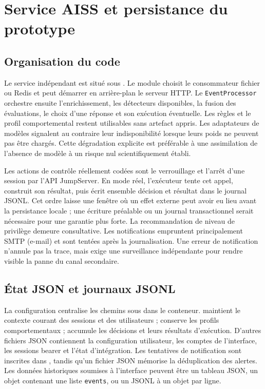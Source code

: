 \documentclass[11pt,a4paper,oneside]{report}
\theoremstyle{definition}
\theoremstyle{plain}
\begin{document}
\section{Service AISS et persistance du prototype}

\subsection{Organisation du code}

Le service indépendant est situé sous . Le
module  choisit le consommateur fichier ou Redis et
peut démarrer en arrière-plan le serveur HTTP. Le
\texttt{EventProcessor} orchestre ensuite l'enrichissement, les détecteurs
disponibles, la fusion des évaluations, le choix d'une réponse et son
exécution éventuelle. Les règles et le profil comportemental restent
utilisables sans artefact appris. Les adaptateurs de modèles signalent au
contraire leur indisponibilité lorsque leurs poids ne peuvent pas être
chargés. Cette dégradation explicite est préférable à une assimilation de
l'absence de modèle à un risque nul scientifiquement établi.

Les actions de contrôle réellement codées sont le verrouillage et l'arrêt
d'une session par l'API JumpServer. En mode réel, l'exécuteur tente cet appel,
construit son résultat, puis écrit ensemble décision et résultat dans le
journal JSONL. Cet ordre laisse une fenêtre où un effet externe peut avoir eu
lieu avant la persistance locale ; une écriture préalable ou un journal
transactionnel serait nécessaire pour une garantie plus forte. La
recommandation de niveau de privilège demeure consultative. Les notifications
empruntent principalement SMTP (e-mail) et sont tentées après la journalisation. Une
erreur de notification n'annule pas la trace, mais exige une surveillance
indépendante pour rendre visible la panne du canal secondaire.

\subsection{État JSON et journaux JSONL}

La configuration centralise les chemins sous  dans le
conteneur.  maintient le contexte courant des
sessions et des utilisateurs ;  conserve les
profils comportementaux ;  accumule les décisions et
leurs résultats d'exécution. D'autres fichiers JSON contiennent la
configuration utilisateur, les comptes de l'interface, les sessions bearer
et l'état d'intégration. Les tentatives de notification sont inscrites dans
, tandis qu'un fichier JSON mémorise la déduplication
des alertes. Les données historiques soumises à l'interface peuvent être un
tableau JSON, un objet contenant une liste \texttt{events}, ou un JSONL à un
objet par ligne.
\end{document}
